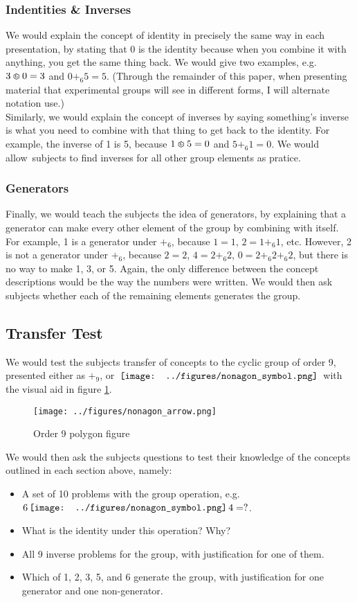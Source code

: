 \documentclass[11pt]{article}
\newcommand{\nonagon}{\,\vcenter{\hbox{\texttt{[image: ../figures/nonagon\_symbol.png]}}}\,}
\def\hex{\mathrel{%
    \mathchoice{\HEX}{\HEX}{\scriptsize\HEX}{\tiny\HEX}%
}}
\def\HEX{{%
    \setbox0\hbox{\varhexagon}%
    \rlap{\hbox to \wd0{\hss\raisebox{1 pt}{\scaleobj{0.6}{6}}\hss}}\box0
}}
\begin{document}
\subsubsection{Indentities \& Inverses}
We would explain the concept of identity in precisely the same way in each presentation, by stating that 0 is the identity because when you combine it with anything, you get the same thing back. We would give two examples, e.g. $3 \hex 0 = 3$ and $0 +_6 5 = 5$. (Through the remainder of this paper, when presenting material that experimental groups will see in different forms, I will alternate notation use.) \\[11pt]
Similarly, we would explain the concept of inverses by saying something's inverse is what you need to combine with that thing to get back to the identity. For example, the inverse of 1 is 5, because $1 \hex 5 = 0$ and $5 +_6 1 = 0$. We would allow\ subjects to find inverses for all other group elements as pratice. 
\subsubsection{Generators}
Finally, we would teach the subjects the idea of generators, by explaining that a generator can make every other element of the group by combining with itself. For example, 1 is a generator under $+_6$, because $1 = 1$, $2 = 1+_6 1$, etc. However, 2 is not a generator under $+_6$, because $2 = 2$, $4 = 2 +_6 2$, $0 = 2+_6 2 +_6 2$, but there is no way to make 1, 3, or 5. Again, the only difference between the concept descriptions would be the way the numbers were written. We would then ask subjects whether each of the remaining elements generates the group.
\subsection{Transfer Test}
We would test the subjects transfer of concepts to the cyclic group of order 9, presented either as $+_9$, or $\nonagon$ with the visual aid in figure \ref{nonagonex}. 
\begin{figure}[H] \centering \texttt{[image: ../figures/nonagon\_arrow.png]} \caption{Order 9 polygon figure} \label{nonagonex} \end{figure} \noindent
We would then ask the subjects questions to test their knowledge of the concepts outlined in each section above, namely:
\begin{itemize} 
\item A set of 10 problems with the group operation, e.g. $6 \nonagon 4 = ?$.
\item What is the identity under this operation? Why?
\item All 9 inverse problems for the group, with justification for one of them.
\item Which of 1, 2, 3, 5, and 6 generate the group, with justification for one generator and one non-generator.
\end{itemize}
\end{document}
